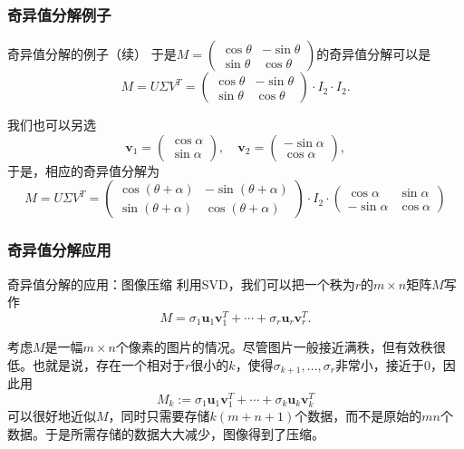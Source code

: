 \begin{frame}
\frametitle{奇异值分解例子}

\begin{block}{奇异值分解的例子（续）}
于是$M = \begin{pmatrix} \cos\theta & -\sin\theta \\ \sin\theta & \cos\theta \end{pmatrix}$的奇异值分解可以是
\[M = U\Sigma V^T = \begin{pmatrix} \cos\theta & -\sin\theta \\ \sin\theta & \cos\theta \end{pmatrix} \cdot I_2 \cdot I_2.\]

\vspace{1em}
\pause

我们也可以另选
\[\mathbf{v}_1 = \begin{pmatrix} \cos\alpha \\ \sin\alpha \end{pmatrix}, \quad \mathbf{v}_2 = \begin{pmatrix} -\sin\alpha \\ \cos\alpha \end{pmatrix},\]
于是，相应的奇异值分解为
\[M = U\Sigma V^T = \begin{pmatrix} \cos(\theta+\alpha) & -\sin(\theta+\alpha) \\ \sin(\theta+\alpha) & \cos(\theta+\alpha) \end{pmatrix} \cdot I_2 \cdot \begin{pmatrix} \cos\alpha & \sin\alpha \\ -\sin\alpha & \cos\alpha \end{pmatrix}\]
\end{block}

\end{frame}


\begin{frame}
\frametitle{奇异值分解应用}

\begin{block}{奇异值分解的应用：图像压缩}
利用SVD，我们可以把一个秩为$r$的$m\times n$矩阵$M$写作
\[M = \sigma_1\mathbf{u}_1\mathbf{v}_1^T + \cdots + \sigma_r\mathbf{u}_r\mathbf{v}_r^T.\]

考虑$M$是一幅$m\times n$个像素的图片的情况。尽管图片一般接近满秩，但{\color{red}有效秩}很低。也就是说，存在一个相对于$r$很小的$k$，使得$\sigma_{k+1},\ldots,\sigma_{r}$非常小，接近于$0$，因此用
\[M_k := \sigma_1\mathbf{u}_1\mathbf{v}_1^T + \cdots + \sigma_k\mathbf{u}_k\mathbf{v}_k^T\]
可以很好地近似$M$，同时只需要存储$k(m+n+1)$个数据，而不是原始的$mn$个数据。于是所需存储的数据大大减少，图像得到了压缩。
\end{block}

\end{frame}

